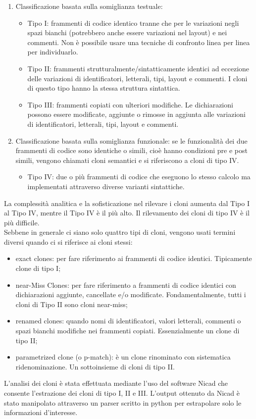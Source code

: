 \begin{enumerate}
\item Classificazione basata sulla somiglianza testuale:
\begin{itemize}
\item	Tipo I: frammenti di codice identico tranne che per le variazioni negli spazi bianchi (potrebbero anche essere variazioni nel layout) e nei commenti. Non è possibile usare una tecniche di confronto linea per linea per individuarlo.
\item	Tipo II: frammenti strutturalmente/sintatticamente identici ad eccezione delle variazioni di identificatori, letterali, tipi, layout e commenti. I cloni di questo tipo hanno la stessa struttura sintattica.
\item	Tipo III: frammenti copiati con ulteriori modifiche. Le dichiarazioni possono essere modificate, aggiunte o rimosse in aggiunta alle variazioni di identificatori, letterali, tipi, layout e commenti.
\end{itemize}
\item Classificazione basata sulla somiglianza funzionale: se le funzionalità dei due frammenti di codice sono identiche o simili, cioè hanno condizioni pre e post simili, vengono chiamati cloni semantici e si riferiscono a cloni di tipo IV.
\begin{itemize}
\item	Tipo IV: due o più frammenti di codice che eseguono lo stesso calcolo ma implementati attraverso diverse varianti sintattiche. 
\end{itemize}
\end{enumerate}
La complessità analitica e la sofisticazione nel rilevare i cloni aumenta dal Tipo I al Tipo IV, mentre il Tipo IV è il più alto. Il rilevamento dei cloni di tipo IV è il più difficile.\\
Sebbene in generale ci siano solo quattro tipi di cloni, vengono usati termini diversi quando ci si riferisce ai cloni stessi:
\begin{itemize}
\item	exact clones: per fare riferimento ai frammenti di codice identici. Tipicamente clone di tipo I;
\item	near-Miss Clones: per fare riferimento a frammenti di codice identici con dichiarazioni aggiunte, cancellate e/o modificate. Fondamentalmente, tutti i cloni di Tipo II sono cloni near-miss;
\item	renamed clones: quando nomi di identificatori, valori letterali, commenti o spazi bianchi modifiche nei frammenti copiati. Essenzialmente un clone di tipo II;
\item	parametrized clone (o p-match): è un clone rinominato con sistematica ridenominazione. Un sottoinsieme di cloni di tipo II.
\end{itemize}
L'analisi dei cloni è stata effettuata mediante l'uso del software Nicad che consente l'estrazione dei cloni di tipo I, II e III. L'output ottenuto da Nicad è stato manipolato attraverso un parser scritto in python per estrapolare solo le informazioni d'interesse.


